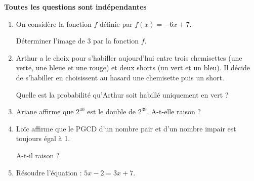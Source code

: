 
\medskip

\textbf{Toutes les questions sont indépendantes}

\medskip

\begin{enumerate}
\item On considère la fonction $f$ définie par $f(x) = - 6x + 7$.

Déterminer l'image de 3 par la fonction $f$.
\item  Arthur a le choix pour s'habiller aujourd'hui entre trois chemisettes (une verte, une bleue et une rouge) et deux shorts (un vert et un bleu). Il décide de s'habiller en choisissent au hasard une chemisette puis un short.

Quelle est la probabilité qu'Arthur soit habillé uniquement en vert ?
\item  Ariane affirme que $2^{40}$ est le double de $2^{39}$.  A-t-elle raison ?
\item  Loïc affirme que le PGCD d'un nombre pair et d'un nombre impair est toujours égal à 1.

A-t-il raison ?
\item  Résoudre l'équation :  $5x - 2 = 3x + 7$.
\end{enumerate}

\vspace{0,5cm}

